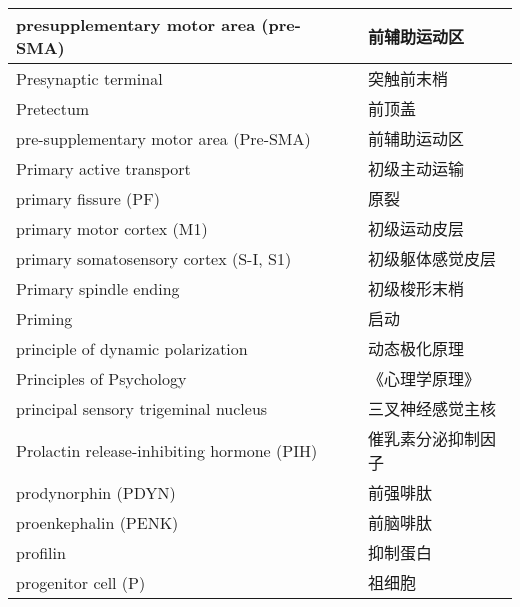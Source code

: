 \begin{longtable}{lll}
	\midrule
	presupplementary motor area (pre-SMA)    && 	前辅助运动区   \\
	
	\midrule
	Presynaptic terminal     && 	突触前末梢   \\
	
	\midrule
	Pretectum     && 	前顶盖   \\
	
	\midrule
	pre-supplementary motor area (Pre-SMA)     && 	前辅助运动区   \\
	
	\midrule
	Primary active transport   && 初级主动运输  \\
	
	\midrule
	primary fissure (PF)   && 原裂  \\
	
	\midrule
	primary motor cortex (M1)   && 初级运动皮层  \\
	
	\midrule
	primary somatosensory cortex (S-I, S1)   && 初级躯体感觉皮层  \\
	
	\midrule
	Primary spindle ending   && 初级梭形末梢  \\
	
	\midrule
	Priming   && 启动  \\
	
	\midrule
	principle of dynamic polarization   && 动态极化原理  \\
	
	\midrule
	Principles of Psychology   && 《心理学原理》  \\
	
	\midrule
	principal sensory trigeminal nucleus   && 三叉神经感觉主核  \\
	
	\midrule
	Prolactin release-inhibiting hormone (PIH)  && 催乳素分泌抑制因子  \\
	
	\midrule
	prodynorphin (PDYN)  && 前强啡肽  \\
	
	\midrule
	proenkephalin (PENK)  && 前脑啡肽  \\
	
	\midrule
	profilin  && 抑制蛋白  \\
	
	\midrule
	progenitor cell (P)   && 祖细胞  \\
	

\end{longtable}
